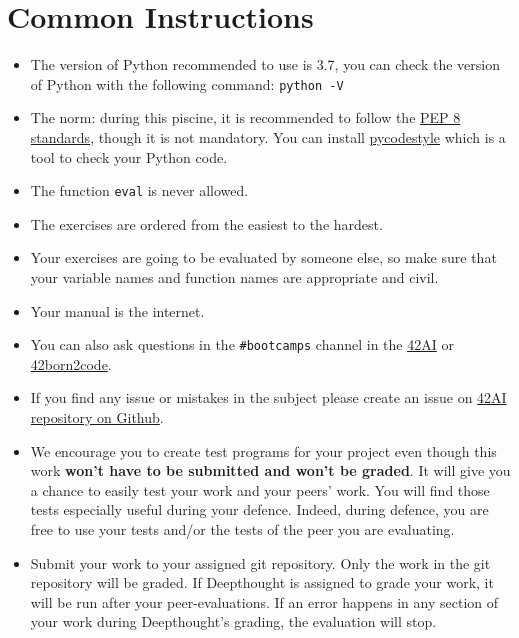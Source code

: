 
\chapter{Common Instructions}
\begin{itemize}
  \item The version of Python recommended to use is 3.7, you can
  check the version of Python with the following command: \texttt{python -V}
  
  \item The norm: during this piscine, it is recommended to follow the
  \href{https://www.python.org/dev/peps/pep-0008/}{PEP 8 standards}, though it is not mandatory.
  You can install \href{https://pypi.org/project/pycodestyle}{pycodestyle} which
  is a tool to check your Python code.
  
  \item The function \texttt{eval} is never allowed.
  
  \item The exercises are ordered from the easiest to the hardest.
  
  \item Your exercises are going to be evaluated by someone else,
  so make sure that your variable names and function names are appropriate and civil. 
  
  \item Your manual is the internet.
  
  \item You can also ask questions in the \texttt{\#bootcamps} channel in the \href{https://42-ai.slack.com}{42AI}
  or \href{42born2code.slack.com}{42born2code}.
  
  \item If you find any issue or mistakes in the subject please create an issue on \href{https://github.com/42-AI/bootcamp_python/issues}{42AI repository on Github}.  
  
  \item We encourage you to create test programs for your
  project even though this work \textbf{won't have to be
  submitted and won't be graded}. It will give you a chance
  to easily test your work and your peers’ work. You will find
  those tests especially useful during your defence. Indeed,
  during defence, you are free to use your tests and/or the
  tests of the peer you are evaluating.
  
  \item Submit your work to your assigned git repository. Only the work in the
  git repository will be graded. If Deepthought is assigned to grade your
  work, it will be run after your peer-evaluations.
  If an error happens in any section of your work during Deepthought's grading,
  the evaluation will stop.
\end{itemize}